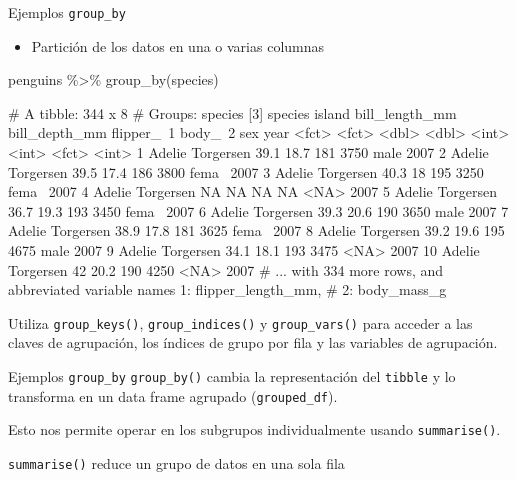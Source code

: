 \documentclass[
  ignorenonframetext,
  aspectratio=169]{beamer}
\newenvironment{Shaded}{\begin{snugshade}}{\end{snugshade}}
\newcommand{\FunctionTok}[1]{\textcolor[rgb]{0.00,0.00,0.00}{#1}}
\newcommand{\NormalTok}[1]{#1}
\newcommand{\SpecialCharTok}[1]{\textcolor[rgb]{0.00,0.00,0.00}{#1}}
\providecommand{\tightlist}{%
  \setlength{\itemsep}{0pt}\setlength{\parskip}{0pt}}
\let\oldverbatim\verbatim
\let\endoldverbatim\endverbatim
\renewenvironment{verbatim}{\tiny\oldverbatim}{\endoldverbatim}
\begin{document}
\begin{frame}[fragile]{Ejemplos \texttt{group\_by}}
\protect\hypertarget{ejemplos-group_by}{}
\begin{itemize}
\tightlist
\item
  Partición de los datos en una o varias columnas
\end{itemize}

\begin{Shaded}
\begin{Highlighting}[]
\NormalTok{penguins }\SpecialCharTok{\%\textgreater{}\%} \FunctionTok{group\_by}\NormalTok{(species)}
\end{Highlighting}
\end{Shaded}

\begin{verbatim}
# A tibble: 344 x 8
# Groups:   species [3]
   species island    bill_length_mm bill_depth_mm flipper_~1 body_~2 sex    year
   <fct>   <fct>              <dbl>         <dbl>      <int>   <int> <fct> <int>
 1 Adelie  Torgersen           39.1          18.7        181    3750 male   2007
 2 Adelie  Torgersen           39.5          17.4        186    3800 fema~  2007
 3 Adelie  Torgersen           40.3          18          195    3250 fema~  2007
 4 Adelie  Torgersen           NA            NA           NA      NA <NA>   2007
 5 Adelie  Torgersen           36.7          19.3        193    3450 fema~  2007
 6 Adelie  Torgersen           39.3          20.6        190    3650 male   2007
 7 Adelie  Torgersen           38.9          17.8        181    3625 fema~  2007
 8 Adelie  Torgersen           39.2          19.6        195    4675 male   2007
 9 Adelie  Torgersen           34.1          18.1        193    3475 <NA>   2007
10 Adelie  Torgersen           42            20.2        190    4250 <NA>   2007
# ... with 334 more rows, and abbreviated variable names 1: flipper_length_mm,
#   2: body_mass_g
\end{verbatim}

Utiliza \texttt{group\_keys()}, \texttt{group\_indices()} y
\texttt{group\_vars()} para acceder a las claves de agrupación, los
índices de grupo por fila y las variables de agrupación.
\end{frame}

\begin{frame}[fragile]{Ejemplos \texttt{group\_by}}
\protect\hypertarget{ejemplos-group_by-1}{}
\texttt{group\_by()} cambia la representación del \texttt{tibble} y lo
transforma en un data frame agrupado (\texttt{grouped\_df}).

Esto nos permite operar en los subgrupos individualmente usando
\texttt{summarise()}.

\texttt{summarise()} reduce un grupo de datos en una sola fila
\end{frame}
\end{document}
